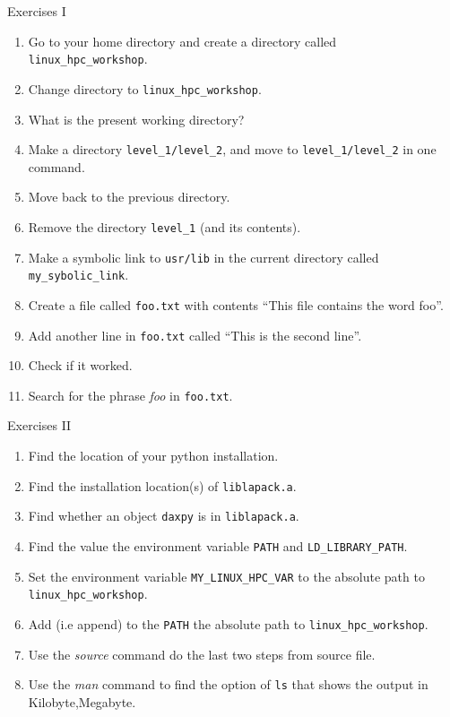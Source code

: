 \documentclass{beamer}
\begin{document}
\begin{frame}{Exercises I}
  \fontsize{8pt}{8}\selectfont
  \begin{enumerate}
    \item Go to your home directory and create a directory called \texttt{linux\_hpc\_workshop}.
    \item Change directory to \texttt{linux\_hpc\_workshop}.
    \item What is the present working directory?
    \item Make a directory \texttt{level\_1/level\_2}, and move to \texttt{level\_1/level\_2} in one command.
    \item Move back to the previous directory.
    \item Remove the directory \texttt{level\_1} (and its contents).
    \item Make a symbolic link to \texttt{usr/lib} in the current directory called \texttt{my\_sybolic\_link}.
    \item Create a file called \texttt{foo.txt} with contents ``This file contains the word foo''.
    \item Add another line in \texttt{foo.txt} called ``This is the second line''.
    \item Check if it worked.
    \item Search for the phrase \emph{foo} in \texttt{foo.txt}.
  \end{enumerate}
\end{frame}


\begin{frame}{Exercises II}
  \fontsize{8pt}{8}\selectfont
  \begin{enumerate}
    \item Find the location of your python installation.
    \item Find the installation location(s) of \texttt{liblapack.a}.
    \item Find whether an object \texttt{daxpy} is in \texttt{liblapack.a}.
    \item Find the value the environment variable \texttt{PATH} and \texttt{LD\_LIBRARY\_PATH}.
    \item Set the environment variable \texttt{MY\_LINUX\_HPC\_VAR} to the absolute path to \texttt{linux\_hpc\_workshop}.
    \item Add (i.e append) to the \texttt{PATH} the absolute path to \texttt{linux\_hpc\_workshop}.
    \item Use the \textit{source} command do the last two steps from source file.
    \item Use the \textit{man} command to find the option of \texttt{ls} that shows the output in Kilobyte,Megabyte.
  \end{enumerate}
\end{frame}
\end{document}
